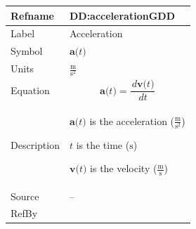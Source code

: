 \documentclass[12pt]{article}
\begin{document}
\begin{minipage}{\textwidth}
\begin{tabular}{>{\raggedright}p{}>{\raggedright\arraybackslash}p{}}
\toprule \textbf{Refname} & \textbf{DD:accelerationGDD}
\label{DD:accelerationGDD}
\\ \midrule
Label & Acceleration
        
\\ \midrule
Symbol & $\symbf{a}\text{(}t\text{)}$
         
\\ \midrule
Units & $\frac{\text{m}}{\text{s}^{2}}$
        
\\ \midrule
Equation & \begin{displaymath}
           \symbf{a}\text{(}t\text{)}=\frac{\,d\symbf{v}\text{(}t\text{)}}{\,dt}
           \end{displaymath}
\\ \midrule
Description & \begin{symbDescription}
              \item{$\symbf{a}\text{(}t\text{)}$ is the acceleration ($\frac{\text{m}}{\text{s}^{2}}$)}
              \item{$t$ is the time (${\text{s}}$)}
              \item{$\symbf{v}\text{(}t\text{)}$ is the velocity ($\frac{\text{m}}{\text{s}}$)}
              \end{symbDescription}
\\ \midrule
Source & --
         
\\ \midrule
RefBy & 
\\ \bottomrule
\end{tabular}
\end{minipage}
\vspace{\baselineskip}
\noindent
\end{document}
